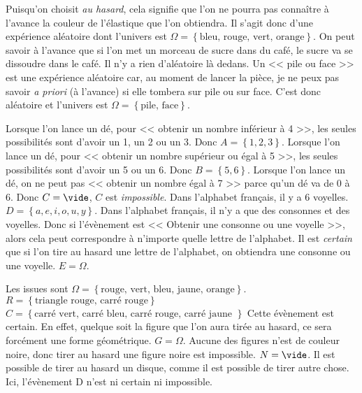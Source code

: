 \documentclass["../Cours.tex"]{subfiles}
\begin{document}
\clearpage
\CORRECTIONS
\begin{questions}
    \exercice 
    \question Puisqu'on choisit \textit{au hasard}, cela signifie que l'on ne pourra pas connaître à l'avance la couleur de l'élastique que l'on obtiendra. Il s'agit donc d'une expérience aléatoire dont l'univers est $\Omega = \left\{ \mbox{bleu, rouge, vert, orange} \right\}$.
    \question On peut savoir à l'avance que si l'on met un morceau de sucre dans du café, le sucre va se dissoudre dans le café. Il n'y a rien d'aléatoire là dedans.
    \question Un << pile ou face >> est une expérience aléatoire car, au moment de lancer la pièce, je ne peux pas savoir \textit{a priori} (à l'avance) si elle tombera sur pile ou sur face. C'est donc aléatoire et l'univers est $\Omega = \left\{ \mbox{pile, face} \right\}$.

    \exercice 
    \question 
        \subquestion Lorsque l'on lance un dé, pour << obtenir un nombre inférieur à 4 >>, les seules possibilités sont d'avoir un 1, un 2 ou un 3. Donc $A = \left\{ 1, 2, 3 \right\}$.
        \subquestion Lorsque l'on lance un dé, pour << obtenir un nombre supérieur ou égal à 5 >>, les seules possibilités sont d'avoir un 5 ou un 6. Donc $B = \left\{ 5, 6 \right\}$.
        \subquestion Lorsque l'on lance un dé, on ne peut pas << obtenir un nombre égal à 7 >> parce qu'un dé va de 0 à 6. Donc $C = \vide$, $C$ est \emph{impossible}.
    \question 
        \subquestion Dans l'alphabet français, il y a 6 voyelles. $D = \left\{ a, e, i, o, u, y \right\}$.
        \subquestion Dans l'alphabet français, il n'y a que des consonnes et des voyelles. Donc si l'évènement est << Obtenir une consonne ou une voyelle >>, alors cela peut correspondre à n'importe quelle lettre de l'alphabet. Il est \textit{certain} que si l'on tire au hasard une lettre de l'alphabet, on obtiendra une consonne ou une voyelle. $E = \Omega$.

    \exercice
    \question Les issues sont $\Omega = \left\{ \mbox{rouge, vert, bleu, jaune, orange} \right\}$.
    \question 
        \subquestion $R = \left\{ \mbox{triangle rouge, carré rouge} \right\}$
        \subquestion $C = \left\{ \mbox{carré vert, carré bleu, carré rouge, carré jaune }\right\}$
    \question 
        \subquestion Cette évènement est certain. En effet, quelque soit la figure que l'on aura tirée au hasard, ce sera forcément une forme géométrique. $G=\Omega$.
        \subquestion Aucune des figures n'est de couleur noire, donc tirer au hasard une figure noire est impossible. $N = \vide$.
        \subquestion Il est possible de tirer au hasard un disque, comme il est possible de tirer autre chose. Ici, l'évènement D n'est ni certain ni impossible.


\end{questions}
\end{document}
